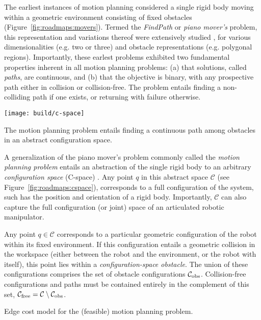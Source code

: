 The earliest instances of motion planning considered a single rigid
body moving within a geometric environment consisting of
fixed obstacles
(Figure~\ref{fig:roadmaps:movers}).
Termed the \emph{FindPath} or \emph{piano mover's} problem,
this representation and variations thereof were extensively studied
\citep{lozanoperezwedley1979collisionfree,
   schwartzsharir1983pianomovers1},
for various dimensionalities (e.g. two or three)
and obstacle representations (e.g. polygonal regions).
Importantly,
these earlest problems exhibited two fundamental properties
inherent in all motion planning problems:
(a) that solutions, called \emph{paths}, are continuous, and
(b) that the objective is binary, with any
prospective path either in collision or collision-free.
The problem entails finding a non-colliding path if one exists,
or returning with failure otherwise.

\begin{marginfigure}
   \centering
   \texttt{[image: build/c-space]} %
   \caption{The motion planning problem entails finding a continuous
      path among obstacles in an abstract configuration space.}
   \label{fig:roadmaps:cspace}
\end{marginfigure}

A generalization of the piano mover's problem
commonly called the \emph{motion planning problem}
entails an abstraction of the single rigid body
to an arbitrary \emph{configuration space} (C-space)
\citep{lozanoperez1983cspace}.
Any point $q$ in this abstract space $\mathcal{C}$
(see Figure~\ref{fig:roadmaps:cspace}),
corresponds to a full configuration of the system,
such has the position and orientation of a rigid body.
Importantly,
$\mathcal{C}$ can also capture the full configuration (or joint)
space of an articulated robotic manipulator.

Any point $q \in \mathcal{C}$ corresponds to a particular geometric
configuration of the robot within its fixed environment.
If this configuration entails a geometric collision in the workspace
(either between the robot and the environment,
or the robot with itself),
this point lies within a \emph{configuration-space obstacle}.
The union of these configurations comprises the set of obstacle
configurations $\mathcal{C}_{\mbox{\scriptsize obs}}$.
Collision-free configurations and paths must be contained entirely
in the complement of this set,
$\mathcal{C}_{\mbox{\scriptsize free}} = \mathcal{C} \setminus \mathcal{C}_{\mbox{\scriptsize obs}}$.

\begin{marginfigure}
   \centering
   \caption{Edge cost model
      for the (feasible) motion planning problem.}
   \label{fig:roadmaps:cost-model-feasible}
\end{marginfigure}

